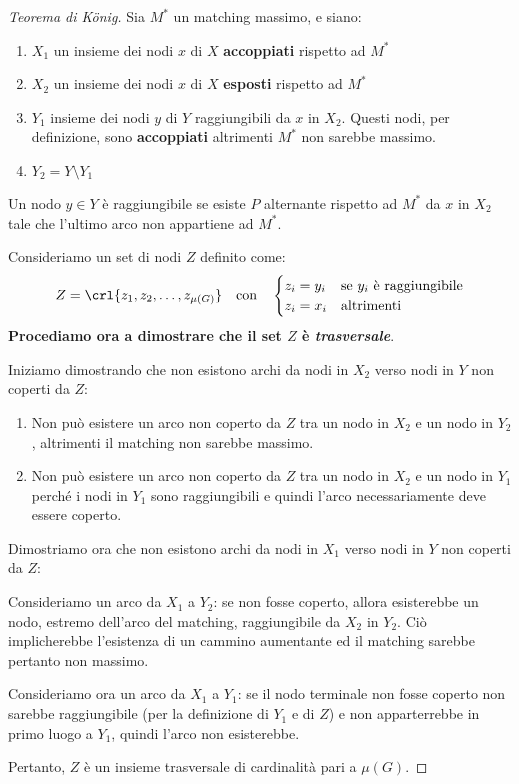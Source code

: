 \documentclass[\main/main.tex]{subfiles}
\begin{document}
\begin{proof}[Teorema di König]
	Sia \(M^*\) un matching massimo, e siano:
	\begin{enumerate}
		\item \(X_1\) un insieme dei nodi \(x\) di \(X\) \textbf{accoppiati} rispetto ad \(M^*\)
		\item \(X_2\) un insieme dei nodi \(x\) di \(X\) \textbf{esposti} rispetto ad \(M^*\)
		\item \(Y_1\) insieme dei nodi \(y\) di \(Y\) raggiungibili da \(x\) in \(X_2\). Questi nodi, per definizione, sono \textbf{accoppiati} altrimenti \(M^*\) non sarebbe massimo.
		\item \(Y_2 = Y \setminus Y_1\)
	\end{enumerate}

	\begin{definition}
		Un nodo \(y \in Y\) è raggiungibile se esiste \(P\) alternante rispetto ad \(M^*\) da \(x\) in \(X_2\) tale che l'ultimo arco non appartiene ad \(M^*\).
	\end{definition}

	Consideriamo un set di nodi \(Z\) definito come:
	\[
		Z = \crl{z_1, z_2, \ldots, z_{\mu(G)}} \quad \text{con} \quad \begin{cases}
			z_i = y_i & \text{se \(y_i\) è raggiungibile} \\
			z_i = x_i & \text{altrimenti}
		\end{cases}
	\]
	\textbf{Procediamo ora a dimostrare che il set \(Z\) è \textit{trasversale}}.

	Iniziamo dimostrando che non esistono archi da nodi in \(X_2\) verso nodi in \(Y\) non coperti da \(Z\):

	\begin{enumerate}
		\item Non può esistere un arco non coperto da \(Z\) tra un nodo in \(X_2\) e un nodo in \(Y_2\), altrimenti il matching non sarebbe massimo.
		\item Non può esistere un arco non coperto da \(Z\) tra un nodo in \(X_2\) e un nodo in \(Y_1\) perché i nodi in \(Y_1\) sono raggiungibili e quindi l'arco necessariamente deve essere coperto.
	\end{enumerate}

	Dimostriamo ora che non esistono archi da nodi in \(X_1\) verso nodi in \(Y\) non coperti da \(Z\):

	Consideriamo un arco da \(X_1\) a \(Y_2\): se non fosse coperto, allora esisterebbe un nodo, estremo dell'arco del matching, raggiungibile da \(X_2\) in \(Y_2\). Ciò implicherebbe l'esistenza di un cammino aumentante ed il matching sarebbe pertanto non massimo.

	Consideriamo ora un arco da \(X_1\) a \(Y_1\): se il nodo terminale non fosse coperto non sarebbe raggiungibile (per la definizione di \(Y_1\) e di \(Z\)) e non apparterrebbe in primo luogo a \(Y_1\), quindi l'arco non esisterebbe.

	Pertanto, \(Z\) è un insieme trasversale di cardinalità pari a \(\mu(G)\).
\end{proof}
\end{document}
